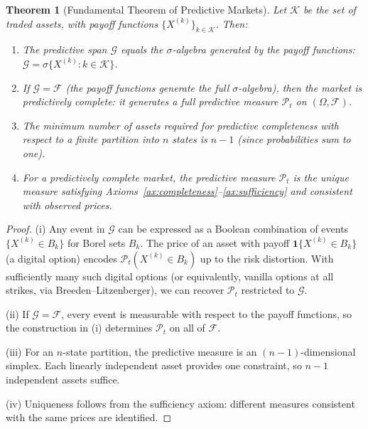 \documentclass[12pt,a4paper]{article}
\newtheorem{theorem}{Theorem}[section]
\theoremstyle{definition}
\newcommand{\F}{\mathcal{F}}
\newcommand{\G}{\mathcal{G}}
\newcommand{\PP}{\mathcal{P}}
\begin{document}
\begin{theorem}[Fundamental Theorem of Predictive Markets]\label{thm:ftpm}
Let $\mathcal{K}$ be the set of traded assets, with payoff functions $\{X^{(k)}\}_{k \in \mathcal{K}}$. Then:
\begin{enumerate}[label=(\roman*)]
    \item The predictive span $\G$ equals the $\sigma$-algebra generated by the payoff functions: $\G = \sigma\{X^{(k)} : k \in \mathcal{K}\}$.
    
    \item If $\G = \F$ (the payoff functions generate the full $\sigma$-algebra), then the market is \emph{predictively complete}: it generates a full predictive measure $\PP_t$ on $(\Omega, \F)$.
    
    \item The minimum number of assets required for predictive completeness with respect to a finite partition into $n$ states is $n-1$ (since probabilities sum to one).
    
    \item For a predictively complete market, the predictive measure $\PP_t$ is the unique measure satisfying Axioms~\ref{ax:completeness}--\ref{ax:sufficiency} and consistent with observed prices.
\end{enumerate}
\end{theorem}

\begin{proof}
(i) Any event in $\G$ can be expressed as a Boolean combination of events $\{X^{(k)} \in B_k\}$ for Borel sets $B_k$. The price of an asset with payoff $\mathbf{1}\{X^{(k)} \in B_k\}$ (a digital option) encodes $\PP_t(X^{(k)} \in B_k)$ up to the risk distortion. With sufficiently many such digital options (or equivalently, vanilla options at all strikes, via Breeden--Litzenberger), we can recover $\PP_t$ restricted to $\G$.

(ii) If $\G = \F$, every event is measurable with respect to the payoff functions, so the construction in (i) determines $\PP_t$ on all of $\F$.

(iii) For an $n$-state partition, the predictive measure is an $(n-1)$-dimensional simplex. Each linearly independent asset provides one constraint, so $n-1$ independent assets suffice.

(iv) Uniqueness follows from the sufficiency axiom: different measures consistent with the same prices are identified.
\end{proof}
\end{document}

